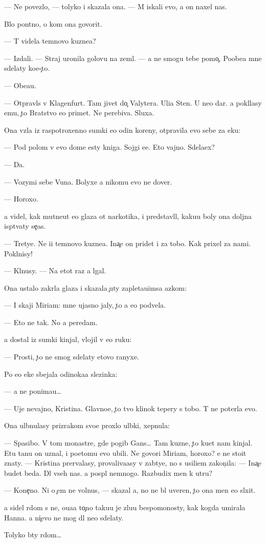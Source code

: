 \documentclass[10pt]{book}
\begin{document}
— Ne povezlo, — tolyko i skazala ona. — M{\yi} iskali {\y}evo, a on naxel nas.

B{\yi}lo pon{\ia}tno, o kom ona govorit.

— T{\yi} videla temnovo kuzne{\q}a?

— Izdali. — Straj uronila golovu na zeml{\iu}. — {\Y}a ne smogu tebe pomo{\c}. Poobe{\x}a{\y} mne sdelaty ko{\y}e-{\c}to.

— Obe{\x}a{\y}u.

— Otpravl{\ia}{\y}s{\ia} v Klagenfurt. Tam jivet do{\c} Valytera. Uli{\q}a Sten{\yi}. U ne{\y}o dar. {\Y}a pokl{\ia}lasy {\y}emu, {\c}to Bratstvo {\y}e{\y}o primet. Ne perebiva{\y}. Sluxa{\y}.

Ona vz{\ia}la iz raspotroxenno{\y} sumki {\y}e{\x}o odin koreny, otpravila {\y}evo sebe za {\x}eku:

— Pod polom v {\y}evo dome {\y}esty kniga. Sojgi {\y}e{\y}e. Eto vajno. Sdela{\y}ex?

— Da.

— Vozymi sebe V{\y}una. Bolyxe {\y}a nikomu {\y}evo ne dover{\iu}.

— Horoxo.

{\Y}a videl, kak mutne{\y}ut {\y}e{\y}o glaza ot narkotika, i predstavl{\ia}l, kaku{\y}u boly ona doljna isp{\yi}t{\yi}vaty se{\y}{\c}as.

— Tretye. Ne i{\x}i temnovo kuzne{\q}a. Ina{\c}e on pridet i za tobo{\y}. Kak prixel za nami. Pokl{\ia}nisy!

— Kl{\ia}nusy. — Na etot raz {\y}a lgal.

Ona ustalo zakr{\yi}la glaza i skazala {\c}uty zapleta{\y}u{\x}imsa {\y}az{\yi}kom:

— I skaji Miriam: mne ujasno jaly, {\c}to {\y}a {\y}e{\y}o podvela.

— Eto ne tak. No {\y}a peredam.

{\Y}a dostal iz sumki kinjal, vlojil v {\y}e{\y}o ruku:

— Prosti, {\c}to ne smog sdelaty etovo ranyxe.

Po {\y}e{\y}o {\x}eke sbejala odinoka{\y}a slezinka:

— {\Y}a ne ponima{\y}u…

— Uje nevajno, Kristina. Glavno{\y}e, {\c}to tvo{\y} klinok tepery s tobo{\y}. T{\yi} ne poter{\ia}la {\y}evo.

Ona ul{\yi}bnulasy prizrakom svo{\y}e{\y} proxlo{\y} ul{\yi}bki, xepnula:

— Spasibo. V tom monast{\yi}re, gde pogib Gans… Tam kuzne{\q}, {\c}to ku{\y}et nam kinjal{\yi}. Etu ta{\y}nu on uznal, i poetomu {\y}evo ubili. Ne govori Miriam, horoxo? {\Y}e{\y} ne sto{\y}it znaty. — Kristina prervalasy, provaliva{\y}asy v zab{\yi}tye, no s usili{\y}em zakon{\c}ila: — Ina{\c}e budet beda. Dl{\ia} vseh nas. {\Y}a pospl{\iu} nemnogo. Razbudix men{\ia} k utru?

— Kone{\c}no. Ni o {\c}em ne volnu{\y}s{\ia}, — skazal {\y}a, no ne b{\yi}l uveren, {\c}to ona men{\ia} {\y}e{\x}o sl{\yi}xit.

{\Y}a sidel r{\ia}dom s ne{\y}, o{\x}u{\x}a{\y}a to{\c}no taku{\y}u je zlu{\y}u bespomo{\x}nosty, kak kogda umirala Hanna. {\Y}a ni{\c}evo ne mog dl{\ia} ne{\y}o sdelaty.

Tolyko b{\yi}ty r{\ia}dom…
\end{document}
